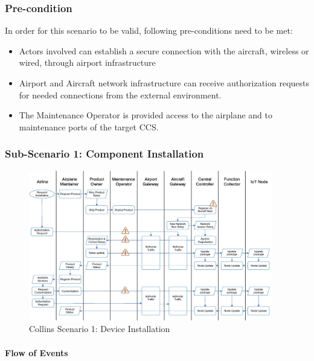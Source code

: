 \subsubsection{Pre-condition}

In order for this scenario to be valid, following pre-conditions need to be met:
\begin{itemize}
	\item Actors involved can establish a secure connection with the aircraft, wireless or wired, through airport
	      infrastructure
	\item Airport and Aircraft network infrastructure can receive authorization requests for needed connections from
	      the external environment.
	\item The Maintenance Operator is provided access to the airplane and to maintenance ports of the target CCS.

\end{itemize}

\subsubsection{Sub-Scenario 1: Component Installation}

\begin{figure}
	\begin{center}
		\includegraphics[width=0.95\textwidth]{figures/collins-s1-installation.jpg}
	\end{center}
	\caption{Collins Scenario 1: Device Installation}
	\label{fig:collins-s1-installation}
\end{figure}

\paragraph{Flow of Events}

